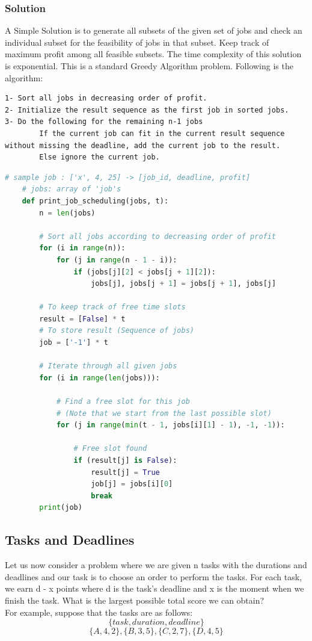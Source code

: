 \documentclass[12pt]{article}
\begin{document}
    \subsubsection{Solution}
    A Simple Solution is to generate all subsets of the given set of jobs and check an individual subset for the feasibility of jobs in that subset. Keep track of maximum profit among all feasible subsets. The time complexity of this solution is exponential.
    This is a standard Greedy Algorithm problem. Following is the algorithm:
	\begin{lstlisting}[numbers=none, frame=none]
1- Sort all jobs in decreasing order of profit.
2- Initialize the result sequence as the first job in sorted jobs.
3- Do the following for the remaining n-1 jobs
        If the current job can fit in the current result sequence without missing the deadline, add the current job to the result.
        Else ignore the current job.
	\end{lstlisting}
	
	\begin{lstlisting}[language=Python]
	# sample job : ['x', 4, 25] -> [job_id, deadline, profit]
	# jobs: array of 'job's
	def print_job_scheduling(jobs, t): 
        n = len(jobs) 
        
        # Sort all jobs according to decreasing order of profit 
        for (i in range(n)): 
            for (j in range(n - 1 - i)): 
                if (jobs[j][2] < jobs[j + 1][2]): 
                    jobs[j], jobs[j + 1] = jobs[j + 1], jobs[j] 
        
        # To keep track of free time slots 
        result = [False] * t 
        # To store result (Sequence of jobs) 
        job = ['-1'] * t 
        
        # Iterate through all given jobs 
        for (i in range(len(jobs))): 
        
            # Find a free slot for this job  
            # (Note that we start from the last possible slot) 
            for (j in range(min(t - 1, jobs[i][1] - 1), -1, -1)): 
                  
                # Free slot found 
                if (result[j] is False): 
                    result[j] = True
                    job[j] = jobs[i][0] 
                    break
        print(job) 

    \end{lstlisting}
    
    \subsection{Tasks and Deadlines}
    Let us now consider a problem where we are given n tasks with the durations and deadlines and our task is to choose an order to perform the tasks. For each task, we earn d \-- x points where d is the task’s deadline and x is the moment when we finish the task. What is the largest possible total score we can obtain?\\
    For example, suppose that the tasks are as follows:\\
    \[\{task, duration, deadline\}\]
    \[\{A, 4, 2\} , \{B, 3, 5\} , \{C, 2, 7\} , \{D, 4, 5\}\]
    
\end{document}
